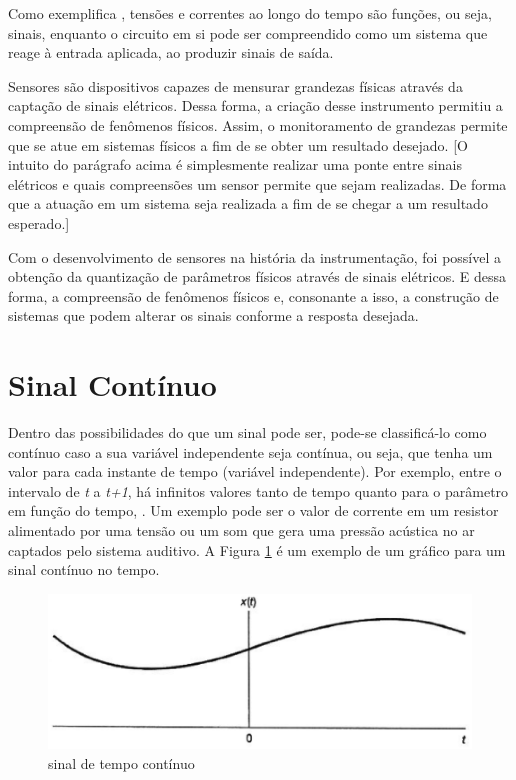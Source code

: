 Como exemplifica \cite{oppenheim2010sinais}, tensões e correntes ao longo do tempo são funções, ou seja, sinais, enquanto o circuito em si pode ser compreendido como um sistema que reage à entrada aplicada, ao produzir sinais de saída.

Sensores são dispositivos capazes de mensurar grandezas físicas através da captação de sinais elétricos. Dessa forma, a criação desse instrumento permitiu a compreensão de fenômenos físicos. Assim, o monitoramento de grandezas permite que se atue em sistemas físicos a fim de se obter um resultado desejado.
[O intuito do parágrafo acima é simplesmente realizar uma ponte entre sinais elétricos e quais compreensões um sensor permite que sejam realizadas. De forma que a atuação em um sistema seja realizada a fim de se chegar a um resultado esperado.]

Com o desenvolvimento de sensores na história da instrumentação, foi possível a obtenção da quantização de parâmetros físicos através de sinais elétricos. E dessa forma, a compreensão de fenômenos físicos e, consonante a isso, a construção de sistemas que podem alterar os sinais conforme a resposta desejada. 

\section{Sinal Contínuo}
Dentro das possibilidades do que um sinal pode ser, pode-se classificá-lo como contínuo caso a sua variável independente seja contínua, ou seja, que tenha um valor para cada instante de tempo (variável independente). Por exemplo, entre o intervalo de \textit{t} a \textit{t+1}, há infinitos valores tanto de tempo quanto para o parâmetro em função do tempo, \cite{oppenheim2010sinais}. Um exemplo pode ser o valor de corrente em um resistor alimentado por uma tensão ou um som que gera uma pressão acústica no ar captados pelo sistema auditivo. A Figura \ref{fig01} é um exemplo de um gráfico para um sinal contínuo no tempo. 

\begin{figure}[h]
	\centering
	\includegraphics[scale=0.5]{figuras/fig01.eps}
	\caption{sinal de tempo contínuo}
	\label{fig01}
\end{figure}
\newpage

